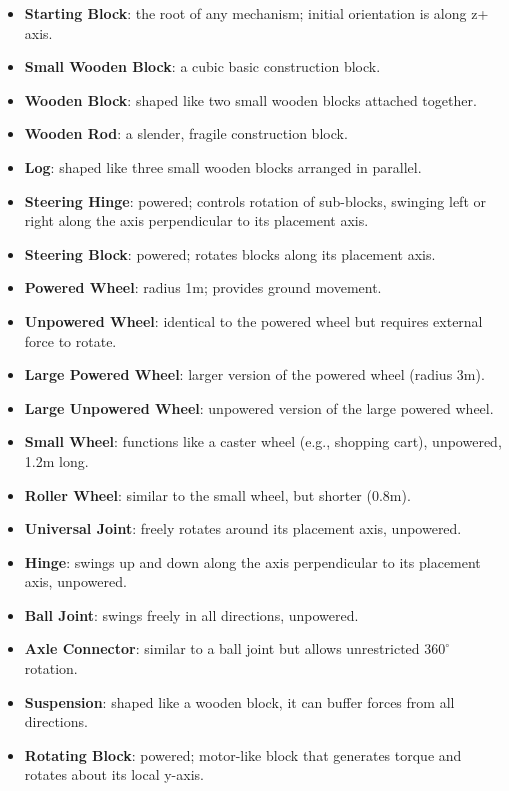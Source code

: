 \begin{itemize}
    \item \textbf{Starting Block}: the root of any mechanism; initial orientation is along z+ axis.
    \item \textbf{Small Wooden Block}: a cubic basic construction block.
    \item \textbf{Wooden Block}: shaped like two small wooden blocks attached together.
    \item \textbf{Wooden Rod}: a slender, fragile construction block.
    \item \textbf{Log}: shaped like three small wooden blocks arranged in parallel.
    \item \textbf{Steering Hinge}: powered; controls rotation of sub-blocks, swinging left or right along the axis perpendicular to its placement axis.
    \item \textbf{Steering Block}: powered; rotates blocks along its placement axis.
    \item \textbf{Powered Wheel}: radius 1m; provides ground movement.
    \item \textbf{Unpowered Wheel}: identical to the powered wheel but requires external force to rotate.
    \item \textbf{Large Powered Wheel}: larger version of the powered wheel (radius 3m).
    \item \textbf{Large Unpowered Wheel}: unpowered version of the large powered wheel.
    \item \textbf{Small Wheel}: functions like a caster wheel (e.g., shopping cart), unpowered, 1.2m long.
    \item \textbf{Roller Wheel}: similar to the small wheel, but shorter (0.8m).
    \item \textbf{Universal Joint}: freely rotates around its placement axis, unpowered.
    \item \textbf{Hinge}: swings up and down along the axis perpendicular to its placement axis, unpowered.
    \item \textbf{Ball Joint}: swings freely in all directions, unpowered.
    \item \textbf{Axle Connector}: similar to a ball joint but allows unrestricted $360^\circ$ rotation.
    \item \textbf{Suspension}: shaped like a wooden block, it can buffer
forces from all directions.
    \item \textbf{Rotating Block}: powered; motor-like block that generates torque and rotates about its local y-axis.

\end{itemize}
